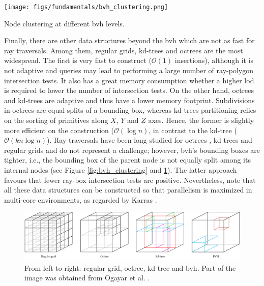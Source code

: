 \begin{marginfigure}[-1.0cm]
    \texttt{[image: figs/fundamentals/bvh\_clustering.png]}
	\caption{Node clustering at different \acrshort{bvh} levels. }
    \label{fig:bvh_clustering}
\end{marginfigure}
Finally, there are other data structures beyond the \acrshort{bvh} which are not as fast for ray traversals. Among them, regular grids, kd-trees and octrees are the most widespread. The first is very fast to construct ($\mathcal{O}(1)$ insertions), although it is not adaptive and queries may lead to performing a large number of ray-polygon intersection tests. It also has a great memory consumption whether a higher \acrshort{lod} is required to lower the number of intersection tests. On the other hand, octrees and kd-trees are adaptive and thus have a lower memory footprint. Subdivisions in octrees are equal splits of a bounding box, whereas kd-trees partitioning relies on the sorting of primitives along $X$, $Y$ and $Z$ axes. Hence, the former is slightly more efficient on the construction ($\mathcal{O}(\log{n})$, in contrast to the kd-tree ($\mathcal{O}(kn \log{n})$). Ray traversals have been long studied for octrees \cite{revelles_efficient_2000}, kd-trees \cite{dos_santos_kd-tree_2009} and regular grids \cite{amanatides_fast_1987} and do not represent a challenge; however, \acrshort{bvh}'s bounding boxes are tighter, i.e., the bounding box of the parent node is not equally split among its internal nodes (see Figure \ref{fig:bvh_clustering} and \ref{fig:data_structures_indexing}). The latter approach favours that fewer ray-box intersection tests are positive. Nevertheless, note that all these data structures can be constructed so that parallelism is maximized in multi-core environments, as regarded by Karras \cite{karras_maximizing_2012}.

\begin{figure}[ht]
	\includegraphics[width=\linewidth]{figs/fundamentals/data_structures.png}
	\caption{From left to right: regular grid, octree, kd-tree and \acrshort{bvh}. Part of the image was obtained from Ogayar et al. \cite{ogayar-anguita_nested_2023}. }
    \label{fig:data_structures_indexing}
\end{figure}